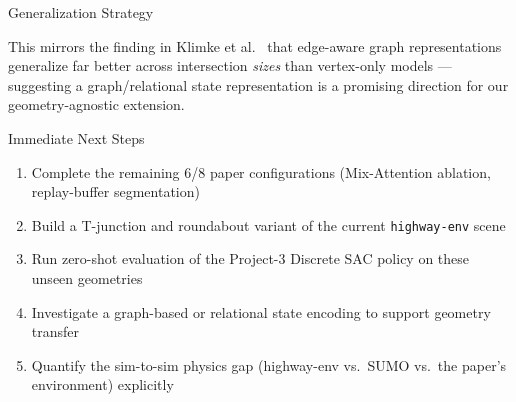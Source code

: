 \documentclass[aspectratio=169,10pt]{beamer}
\begin{document}
\begin{frame}{Generalization Strategy}
    \centering
    \vspace{6pt}
    \small This mirrors the finding in Klimke et al.\ \cite{klimke2022enhanced} that edge-aware graph representations generalize far better across intersection \emph{sizes} than vertex-only models --- suggesting a graph/relational state representation is a promising direction for our geometry-agnostic extension.
\end{frame}

\begin{frame}{Immediate Next Steps}
    \begin{enumerate}
        \item Complete the remaining 6/8 paper configurations (Mix-Attention ablation, replay-buffer segmentation)
        \item Build a T-junction and roundabout variant of the current \texttt{highway-env} scene
        \item Run zero-shot evaluation of the Project-3 Discrete SAC policy on these unseen geometries
        \item Investigate a graph-based or relational state encoding to support geometry transfer
        \item Quantify the sim-to-sim physics gap (highway-env vs.\ SUMO vs.\ the paper's environment) explicitly
    \end{enumerate}
\end{frame}
\end{document}
